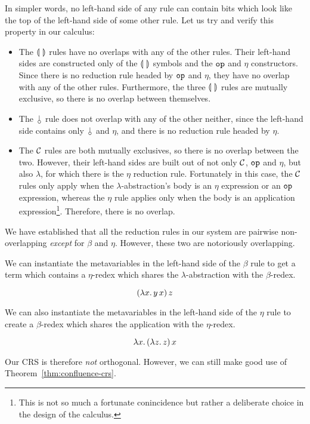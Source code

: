 In simpler words, no left-hand side of any rule can contain bits which look
like the top of the left-hand side of some other rule. Let us try and
verify this property in our calculus:
\begin{itemize}
\item The $\llparenthesis \,  \, \rrparenthesis$ rules have no overlaps with any of the other
  rules. Their left-hand sides are constructed only of the $\llparenthesis \,  \, \rrparenthesis$
  symbols and the $\mathtt{op}$ and $\eta$ constructors. Since there is no
  reduction rule headed by $\mathtt{op}$ and $\eta$, they have no overlap with
  any of the other rules. Furthermore, the three $\llparenthesis \,  \, \rrparenthesis$ rules are
  mutually exclusive, so there is no overlap between themselves.
\item The $\cherry$ rule does not overlap with any of the other neither,
  since the left-hand side contains only $\cherry$ and $\eta$, and there is
  no reduction rule headed by $\eta$.
\item The $\mathcal{C}$ rules are both mutually exclusives, so there is no overlap
  between the two. However, their left-hand sides are built out of not only
  $\mathcal{C}$, $\mathtt{op}$ and $\eta$, but also $\lambda$, for which there is the
  $\eta$ reduction rule. Fortunately in this case, the $\mathcal{C}$ rules only
  apply when the $\lambda$-abstraction's body is an $\eta$ expression or an
  $\mathtt{op}$ expression, whereas the $\eta$ rule applies only when the
  body is an application expression\footnote{This is not so much a
    fortunate conincidence but rather a deliberate choice in the design of
    the calculus.}. Therefore, there is no overlap.
\end{itemize}

We have established that all the reduction rules in our system are pairwise
non-overlapping \emph{except} for $\beta$ and $\eta$. However,
these two are notoriously overlapping.

We can instantiate the metavariables in the left-hand side of the
$\beta$ rule to get a term which contains a $\eta$-redex which shares
the $\lambda$-abstraction with the $\beta$-redex.

$$
(\lambda x.\, y\,x)\,z
$$

We can also instantiate the metavariables in the left-hand side of the
$\eta$ rule to create a $\beta$-redex which shares the application with
the $\eta$-redex.

$$
\lambda x.\, (\lambda z.\, z)\,x
$$

Our CRS is therefore \emph{not} orthogonal. However, we can still make good
use of Theorem~\ref{thm:confluence-crs}.

